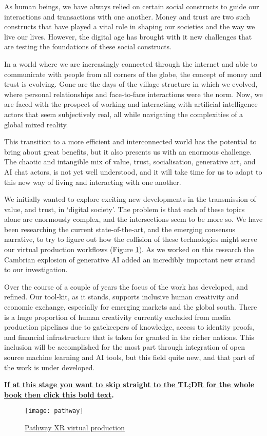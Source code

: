 As human beings, we have always relied on certain social constructs to guide our interactions and transactions with one another. Money and trust are two such constructs that have played a vital role in shaping our societies and the way we live our lives. However, the digital age has brought with it new challenges that are testing the foundations of these social constructs.\par
In a world where we are increasingly connected through the internet and able to communicate with people from all corners of the globe, the concept of money and trust is evolving. Gone are the days of the village structure in which we evolved, where personal relationships and face-to-face interactions were the norm. Now, we are faced with the prospect of working and interacting with artificial intelligence actors that seem subjectively real, all while navigating the complexities of a global mixed reality.\par
This transition to a more efficient and interconnected world has the potential to bring about great benefits, but it also presents us with an enormous challenge. The chaotic and intangible mix of value, trust, socialisation, generative art, and AI chat actors, is not yet well understood, and it will take time for us to adapt to this new way of living and interacting with one another.\par
We initially wanted to explore exciting new developments in the transmission of value, and trust, in `digital society'. The problem is that each of these topics alone are enormously complex, and the intersections seem to be more so. We have been researching the current state-of-the-art, and the emerging consensus narrative, to try to figure out how the collision of these technologies might serve our virtual production workflows (Figure \ref{fig:pathway}). As we worked on this research the Cambrian explosion of generative AI added an incredibly important new strand to our investigation.\par
Over the course of a couple of years the focus of the work has developed, and refined. Our tool-kit, as it stands, supports inclusive human creativity and economic exchange, especially for emerging markets and the global south. There is a huge proportion of human creativity currently excluded from media production pipelines due to gatekeepers of knowledge, access to identity proofs, and financial infrastructure that is taken for granted in the richer nations. This inclusion will be accomplished for the most part through integration of open source machine learning and AI tools, but this field quite new, and that part of the work is under developed.\par

\textbf{\hyperref[sec:tldr]{If at this stage you want to skip straight to the TL;DR for the whole book then click this bold text}.}\par
\begin{figure}
  \centering
   \texttt{[image: pathway]}
 \caption{\href{https://www.pathwayxr.studio/}{Pathway XR virtual production}}
    \label{fig:pathway}
\end{figure}

